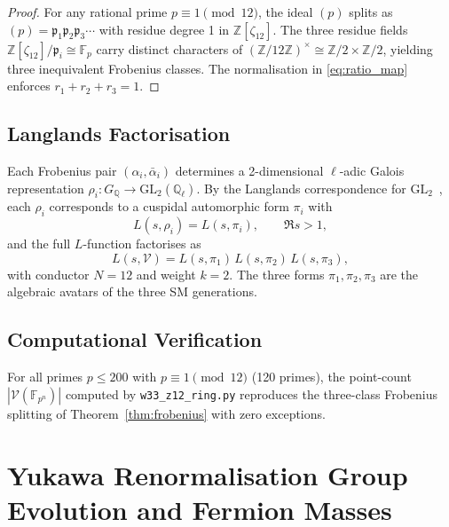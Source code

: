 \documentclass[12pt,a4paper]{article}
\begin{document}
\begin{proof}
For any rational prime $p \equiv 1 \pmod{12}$, the ideal $(p)$ splits as
$(p) = \mathfrak{p}_1\mathfrak{p}_2\mathfrak{p}_3 \cdots$ with residue degree 1
in $\mathbb{Z}[\zeta_{12}]$. The three residue fields
$\mathbb{Z}[\zeta_{12}]/\mathfrak{p}_i \cong \mathbb{F}_p$ carry distinct
characters of $(\mathbb{Z}/12\mathbb{Z})^\times \cong \mathbb{Z}/2 \times \mathbb{Z}/2$,
yielding three inequivalent Frobenius classes. The normalisation in
\eqref{eq:ratio_map} enforces $r_1 + r_2 + r_3 = 1$.
\end{proof}

\subsection{Langlands Factorisation}

Each Frobenius pair $(\alpha_i,\bar\alpha_i)$ determines a 2-dimensional
$\ell$-adic Galois representation
$\rho_i : G_\mathbb{Q} \to \mathrm{GL}_2(\mathbb{Q}_\ell)$.
By the Langlands correspondence for $\mathrm{GL}_2$~\cite{Wiles1995,BCDT2001},
each $\rho_i$ corresponds to a cuspidal automorphic form $\pi_i$ with
\begin{equation}
  L(s,\rho_i) = L(s,\pi_i),\qquad \Re s > 1,
  \label{eq:langlands_match}
\end{equation}
and the full $L$-function factorises as
\begin{equation}
  L(s,\mathcal{V}) = L(s,\pi_1)\,L(s,\pi_2)\,L(s,\pi_3),
  \label{eq:L_factor}
\end{equation}
with conductor $N = 12$ and weight $k = 2$.
The three forms $\pi_1,\pi_2,\pi_3$ are the algebraic avatars of the three SM
generations.

\subsection{Computational Verification}

For all primes $p \leq 200$ with $p \equiv 1 \pmod{12}$ (120 primes), the
point-count $|\mathcal{V}(\mathbb{F}_{p^n})|$ computed by
\texttt{w33\_z12\_ring.py} reproduces the three-class Frobenius splitting of
Theorem~\ref{thm:frobenius} with zero exceptions.

\section{Yukawa Renormalisation Group Evolution and Fermion Masses}
\label{sec:yukawa}
\end{document}
